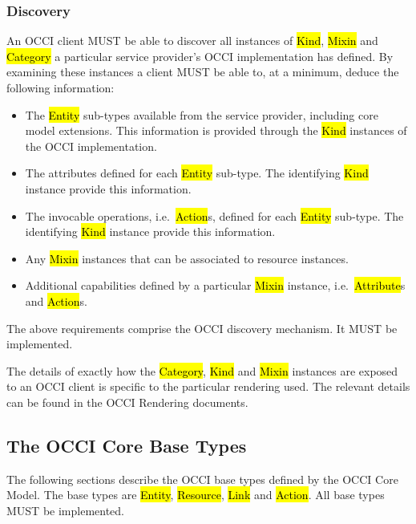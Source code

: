 \documentclass[10pt,a4paper]{article}
\begin{document}
\subsubsection{Discovery}
\label{sec:discovery}
An OCCI client MUST be able to discover all instances of \hl{Kind},
\hl{Mixin} and \hl{Category} a particular service provider's OCCI
implementation has defined. By examining these instances a client MUST
be able to, at a minimum, deduce the following information:
%
\begin{itemize}
  \item The \hl{Entity} sub-types available from the service provider,
    including core model extensions. This information is provided
    through the \hl{Kind} instances of the OCCI implementation.
  \item The attributes defined for each \hl{Entity} sub-type. The
    identifying \hl{Kind} instance provide this information.
  \item The invocable operations, i.e.~\hl{Action}s, defined for each
    \hl{Entity} sub-type. The identifying \hl{Kind} instance provide
    this information.
  \item Any \hl{Mixin} instances that can be associated to resource
    instances.
  \item Additional capabilities defined by a particular \hl{Mixin}
    instance, i.e.~\hl{Attribute}s and \hl{Action}s.
\end{itemize}
%
The above requirements comprise the OCCI discovery mechanism. It MUST
be implemented.

The details of exactly how the \hl{Category}, \hl{Kind} and \hl{Mixin}
instances are exposed to an OCCI client is specific to the particular
rendering used.
The relevant details can be found in the OCCI Rendering documents.

\subsection{The OCCI Core Base Types}
\label{sec:base_types}
The following sections describe the OCCI base types defined by the
OCCI Core Model.  The base types are \hl{Entity}, \hl{Resource},
\hl{Link} and \hl{Action}. All base types MUST be implemented.
\end{document}
